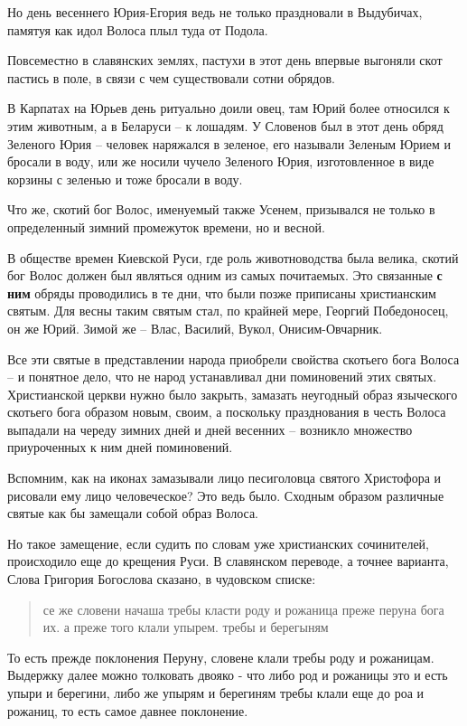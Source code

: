 \documentclass[a5paper,11pt,openany]{article}
\begin{document}
   Но день весеннего Юрия-Егория ведь не только праздновали в Выдубичах, памятуя как идол Волоса плыл туда от Подола. 

   Повсеместно в славянских землях, пастухи в этот день впервые выгоняли скот пастись в поле, в связи с чем существовали сотни обрядов.

 В Карпатах на Юрьев день ритуально доили овец, там Юрий более относился к этим животным, а в Беларуси – к лошадям. У Словенов был в этот день обряд Зеленого Юрия – человек наряжался в зеленое, его называли Зеленым Юрием и бросали в воду, или же носили чучело Зеленого Юрия, изготовленное в виде корзины с зеленью и тоже бросали в воду.

  Что же, скотий бог Волос, именуемый также Усенем, призывался не только в определенный зимний промежуток времени, но и весной. 

  В обществе времен Киевской Руси, где роль животноводства была велика, скотий бог Волос должен был являться одним из самых почитаемых. Это связанные \textbf{с ним} обряды проводились в те дни, что были позже приписаны христианским святым. Для весны таким святым стал, по крайней мере, Георгий Победоносец, он же Юрий. Зимой же – Влас, 
Василий, Вукол, Онисим-Овчарник.

  Все эти святые в представлении народа приобрели свойства скотьего бога Волоса – и понятное дело, что не народ устанавливал дни поминовений этих святых. Христианской церкви нужно было закрыть, замазать неугодный образ языческого скотьего бога образом новым, своим, а поскольку празднования в честь Волоса выпадали на череду зимних дней и дней весенних – возникло множество приуроченных к ним дней поминовений.

 Вспомним, как на иконах замазывали лицо песиголовца святого Христофора и рисовали ему лицо человеческое? Это ведь было. Сходным образом различные святые как бы замещали собой образ Волоса. 

   Но такое замещение, если судить по словам уже христианских сочинителей, происходило еще до крещения Руси. В славянском переводе, а точнее варианта, Слова Григория Богослова сказано, в чудовском списке:

\begin{quotation}
\noindent се же словени начаша требы класти роду и рожаница преже перуна бога их. а преже того клали упырем. требы и берегыням
\end{quotation}

То есть прежде поклонения Перуну, словене клали требы роду и рожаницам. Выдержку далее можно толковать двояко - что либо род и рожаницы это и есть упыри и берегини, либо же упырям и берегиням требы клали еще до роа и рожаниц, то есть самое давнее поклонение. 
\end{document}
